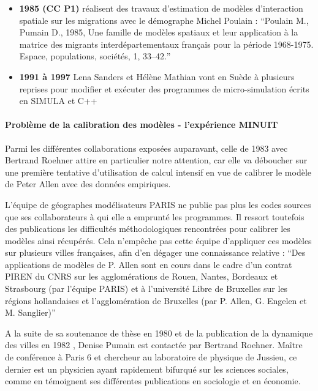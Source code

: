 \begin{itemize}[label=\textbullet]

\item \textbf{1985 (CC P1)} \textcite{Poulain1985} réalisent des travaux d’estimation de modèles d’interaction spatiale sur les migrations avec le démographe Michel Poulain : \foreignquote{english}{Poulain M., Pumain D., 1985, Une famille de modèles spatiaux et leur application à la matrice des migrants interdépartementaux français pour la période 1968-1975. Espace, populations, sociétés, 1, 33–42.}

\item \textbf{1991 à 1997} Lena Sanders et Hélène Mathian vont en Suède à plusieurs reprises pour modifier et exécuter des programmes de micro-simulation écrits en SIMULA et C++

\end{itemize}

\paragraph{Problème de la calibration des modèles - l'expérience MINUIT}
\label{p:experience_minuit}

Parmi les différentes collaborations exposées auparavant, celle de 1983 avec Bertrand Roehner attire en particulier notre attention, car elle va déboucher sur une première tentative d’utilisation de calcul intensif en vue de calibrer le modèle de Peter Allen avec des données empiriques.

L'équipe de géographes modélisateurs PARIS ne publie pas plus les codes sources que ses collaborateurs à qui elle a emprunté les programmes. Il ressort toutefois des publications les difficultés méthodologiques rencontrées pour calibrer les modèles ainsi récupérés. Cela n'empêche pas cette équipe d'appliquer ces modèles sur plusieurs villes françaises, afin d'en dégager une connaissance relative \autocite[134]{Pumain1984} : \enquote{Des applications de modèles de P. Allen sont en cours dans le cadre d'un contrat PIREN du CNRS sur les agglomérations de Rouen, Nantes, Bordeaux et Strasbourg (par l'équipe PARIS) et à l'université Libre de Bruxelles sur les régions hollandaises et l'agglomération de Bruxelles (par P. Allen, G. Engelen et M. Sanglier)}

A la suite de sa soutenance de thèse en 1980 et de la publication de la dynamique des villes en 1982 \autocite{Pumain1982}, Denise Pumain est contactée par Bertrand Roehner. Maître de conférence à Paris 6 et chercheur au laboratoire de physique de Jussieu, ce dernier est un physicien ayant rapidement bifurqué sur les sciences sociales, comme en témoignent ses différentes publications en sociologie et en économie.


